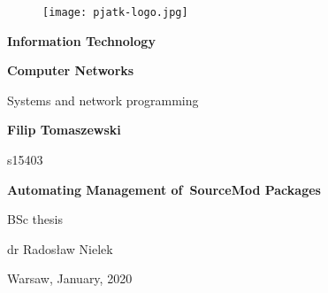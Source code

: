 \thispagestyle{empty}

\begin{figure}[H]
  \centering
  \texttt{[image: pjatk-logo.jpg]}
\end{figure}

\begin{center}

{\large \textbf{Information Technology}}

\vspace{1cm}

{\large \textbf{Computer Networks}}

\vspace{0.25cm}

Systems and network programming

\vspace{2cm}

{\large \textbf{Filip Tomaszewski}}

s15403

\vspace{1.5cm}

{\LARGE \textbf{Automating Management of~SourceMod Packages}}

\vspace{2cm}

\begin{flushright}

BSc thesis

dr Radosław Nielek

\end{flushright}

\vspace{\fill}

Warsaw, January, 2020

\end{center}

\newpage
{}
\setcounter{page}{1}
